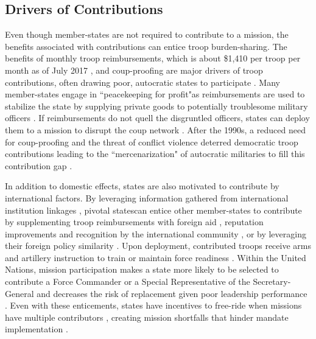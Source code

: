 \documentclass[12pt]{article}
\begin{document}
\subsection*{Drivers of Contributions}

Even though member-states are not required to contribute to a mission, the benefits associated with contributions can entice troop burden-sharing. The benefits of monthly troop reimbursements, which is about \$1,410 per troop per month as of July 2017 \citep{UN_deploy}, and coup-proofing are major drivers of troop contributions, often drawing poor, autocratic states to participate \citep{gaibulloev2015,kathman2017,duursma2019,levin2021test}. Many member-states engage in ``peacekeeping for profit"\footnotemark[2] as reimbursements are used to stabilize the state by supplying private goods to potentially troublesome military officers \citep{gaibulloev2015, kathman2017,lundgren2018}. If reimbursements do not quell the disgruntled officers, states can deploy them to a mission to disrupt the coup network \citep{hesse2015,kathman2017,levin2021test}. After the 1990s, a reduced need for coup-proofing \citep{levin2021test} and the threat of conflict violence deterred democratic troop contributions leading to the ``mercenarization" of autocratic militaries to fill this contribution gap \citep{bove2011,duursma2019}. 


In addition to domestic effects, states are also motivated to contribute by international factors. By leveraging information gathered from international institution linkages \citep{joshi2020}, pivotal states\footnotemark[3] can entice other member-states to contribute by supplementing troop reimbursements with foreign aid \citep{boutton2020,oestman2021price}, reputation improvements and recognition by the international community \citep{neack1995peace,hesse2015,meiske2017peacekeeping,levin2020}, or by leveraging their foreign policy similarity \citep{ward2016}. Upon deployment, contributed troops receive arms and artillery instruction to train or maintain force readiness \citep{kathman2017}. Within the United Nations, mission participation makes a state more likely to be selected to contribute a Force Commander or a Special Representative of the Secretary-General \citep{oksamytna2021} and decreases the risk of replacement given poor leadership performance \citep{lundgren2021}. Even with these enticements, states have incentives to free-ride when missions have multiple contributors \citep{bove2011}, creating mission shortfalls that hinder mandate implementation \citep{passmore2018}. 
\end{document}
